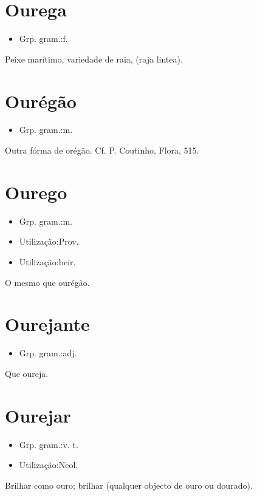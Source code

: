 \section{Ourega}
\begin{itemize}
\item {Grp. gram.:f.}
\end{itemize}
Peixe marítimo, variedade de raia, (\textunderscore raja lintea\textunderscore ).
\section{Ourégão}
\begin{itemize}
\item {Grp. gram.:m.}
\end{itemize}
Outra fórma de \textunderscore orégão\textunderscore . Cf. P. Coutinho, \textunderscore Flora\textunderscore , 515.
\section{Ourego}
\begin{itemize}
\item {Grp. gram.:m.}
\end{itemize}
\begin{itemize}
\item {Utilização:Prov.}
\end{itemize}
\begin{itemize}
\item {Utilização:beir.}
\end{itemize}
O mesmo que \textunderscore ourégão\textunderscore .
\section{Ourejante}
\begin{itemize}
\item {Grp. gram.:adj.}
\end{itemize}
Que oureja.
\section{Ourejar}
\begin{itemize}
\item {Grp. gram.:v. t.}
\end{itemize}
\begin{itemize}
\item {Utilização:Neol.}
\end{itemize}
Brilhar como ouro; brilhar (qualquer objecto de ouro ou dourado).
